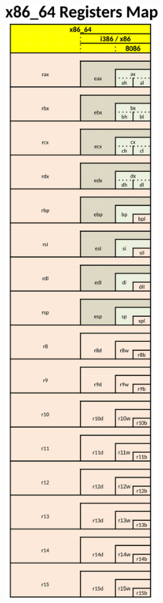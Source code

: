 \documentclass[letterpaper,12pt]{exam}
\begin{document}
\begin{center}
\includegraphics[height=9in]{../../02_Registers/images/X86_64-GP-registersBIG}
    

\end{center}
\end{document}
